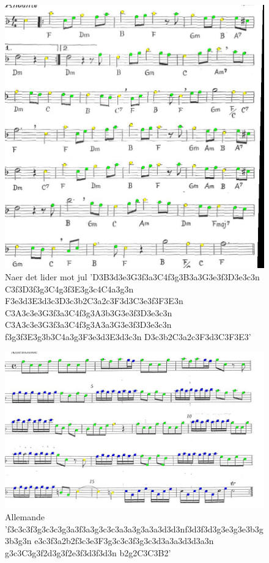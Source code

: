 \begin{figure}[Htb]
    \centering
		\includegraphics[width=\textwidth]{im10s_compare.jpg}
		\caption[Naer det lider mot jul]{Naer det lider mot jul \newline
		'D3B3d3e3G3f3a3C4f3g3B3a3G3e3f3D3e3c3n\newline
		C3f3D3f3g3C4g3f3E3g3c4C4a3g3n\newline
		F3e3d3E3d3c3D3c3b2C3a2c3F3d3C3e3f3F3E3n\newline
		C3A3c3e3G3f3a3C4f3g3A3b3G3e3f3D3e3c3n\newline
		C3A3c3e3G3f3a3C4f3g3A3a3G3e3f3D3e3c3n\newline
		f3g3f3E3g3b3C4a3g3F3e3d3E3d3c3n \newline
		D3c3b2C3a2c3F3d3C3F3E3'}
\end{figure}

\begin{figure}
    \centering
		\includegraphics[width=\textwidth]{im13s_compare.jpg}
		\caption[Allemande ]{Allemande 		'f3c3c3f3g3c3c3g3a3f3a3g3c3c3a3a3g3a3a3d3d3n\newline 		f3d3f3d3g3e3g3e3b3g3b3g3n 		e3c3f3a2b2f3c3e3F3g3c3c3f3g3c3d3a3a3d3d3a3n \newline
		g3c3C3g3f2d3g3f2e3f3d3f3d3n 
		b2g2C3C3B2' \label{fig:allemande}}
\end{figure}
